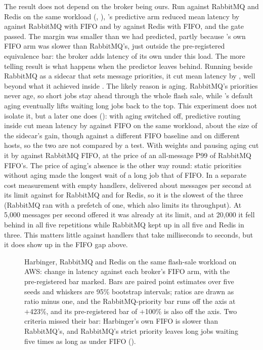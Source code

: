 The result does not depend on the broker being ours. Run against RabbitMQ and Redis on the same workload
(, ), \sys{}'s predictive arm reduced mean latency by \EThreeVsRabbitAbs{} against RabbitMQ with FIFO and by
\EThreeVsRedisAbs{} against Redis with FIFO, and the gate passed. The margin was smaller than we had predicted, partly
because \sys{}'s own FIFO arm was \EThreeFifoGapAbs{} slower than RabbitMQ's, just outside the pre-registered equivalence bar:
the broker adds latency of its own under this load. The more telling result is what happens when the predictor leaves
\sys{} behind. Running beside RabbitMQ as a sidecar that sets message priorities, it cut mean latency by \EThreeSidecarAbs{},
well beyond what it achieved inside \sys{}. The likely reason is aging. RabbitMQ's priorities never age, so short jobs stay
ahead through the whole flash sale, while \sys{}'s default aging eventually lifts waiting long jobs back to the top. This experiment does not isolate it, but a later one does ():
with aging switched off, predictive routing inside \sys{} cut mean latency by \BaseNoAgingVsFifoAbs{} against FIFO on the same workload, about the size of the sidecar's gain, though against a different FIFO baseline and on different hosts, so the two are not compared by a test. With weights and pausing aging \sys{} cut it by \EThreeWeightedAbs{} against RabbitMQ FIFO, at the price of an all-message P99 of \EThreeWeightedPNinetyNine{} RabbitMQ FIFO's. The price of aging's absence is the other way round: static priorities without
aging made the longest wait of a long job \EThreeStaticLongWait{} that of FIFO. In a separate cost measurement with
empty handlers, \sys{} delivered about \EFourHarbingerPeak{} messages per second at its limit against \EFourRabbitPeak{} for RabbitMQ and
\EFourRedisPeak{} for Redis, so it is the slowest of the three (RabbitMQ ran with a prefetch of one, which also limits its throughput). At 5{,}000 messages per second offered it was already at its limit, and at 20{,}000 it fell behind in all five repetitions while RabbitMQ kept up in all five and Redis in three. This matters little against handlers that take milliseconds to
seconds, but it does show up in the FIFO gap above.

\begin{figure}[t]
  \centering
  
  \caption{Harbinger, RabbitMQ and Redis on the same flash-sale workload on AWS: change in latency against each broker's FIFO arm, with the pre-registered bar marked. Bars are paired point estimates over five seeds and whiskers are 95\% bootstrap intervals; ratios are drawn as ratio minus one, and the RabbitMQ-priority bar runs off the axis at $+$423\%, and its pre-registered bar of $+$100\% is also off the axis. Two criteria missed their bar: Harbinger's own FIFO is slower than RabbitMQ's, and RabbitMQ's strict priority leaves long jobs waiting five times as long as under FIFO ().}\label{fig:brokers}
\end{figure}


